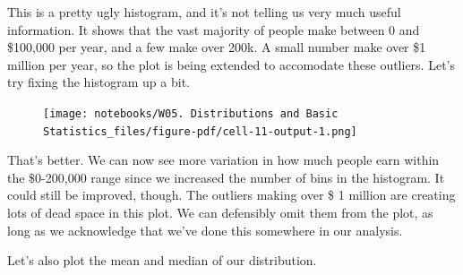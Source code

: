 \documentclass[
  letterpaper,
  DIV=11,
  numbers=noendperiod]{scrreprt}
\newenvironment{Shaded}{\begin{snugshade}}{\end{snugshade}}
\newcommand{\CommentTok}[1]{\textcolor[rgb]{0.37,0.37,0.37}{#1}}
\newcommand{\DecValTok}[1]{\textcolor[rgb]{0.68,0.00,0.00}{#1}}
\newcommand{\NormalTok}[1]{\textcolor[rgb]{0.00,0.23,0.31}{#1}}
\newcommand{\OperatorTok}[1]{\textcolor[rgb]{0.37,0.37,0.37}{#1}}
\newcommand{\StringTok}[1]{\textcolor[rgb]{0.13,0.47,0.30}{#1}}
\newcommand{\VariableTok}[1]{\textcolor[rgb]{0.07,0.07,0.07}{#1}}
\begin{document}
This is a pretty ugly histogram, and it's not telling us very much
useful information. It shows that the vast majority of people make
between 0 and \$100,000 per year, and a few make over 200k. A small
number make over \$1 million per year, so the plot is being extended to
accomodate these outliers. Let's try fixing the histogram up a bit.

\begin{Shaded}
\end{Shaded}

\begin{figure}[H]

{\centering \texttt{[image: notebooks/W05. Distributions and Basic Statistics\_files/figure-pdf/cell-11-output-1.png]}

}

\end{figure}

That's better. We can now see more variation in how much people earn
within the \$0-200,000 range since we increased the number of bins in
the histogram. It could still be improved, though. The outliers making
over \$ 1 million are creating lots of dead space in this plot. We can
defensibly omit them from the plot, as long as we acknowledge that we've
done this somewhere in our analysis.

Let's also plot the mean and median of our distribution.
\end{document}
